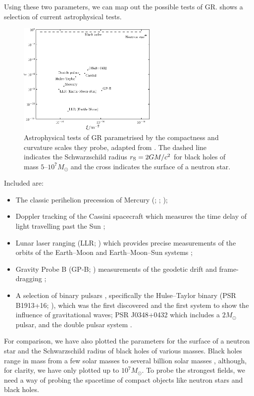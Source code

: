 Using these two parameters, we can map out the possible tests of GR.  shows a selection of current astrophysical tests.
\begin{figure}
  \begin{center}
  \includegraphics[width=0.6\textwidth]{./images/Fig_Psaltis_plot}
    \caption{Astrophysical tests of GR parametrised by the compactness and curvature scales they probe, adapted from \citet{Psaltis2008a}. The dashed line indicates the Schwarzschild radius $r_\mathrm{S} = 2 GM /c^2$ for black holes of mass $5$--$10^7M_\odot$ and the cross indicates the surface of a neutron star.}   
    \label{fig:Psaltis} 
  \end{center}
\end{figure}
Included are:
\begin{itemize}
\item The classic perihelion precession of Mercury (\citealt[section 10.2]{Hobson2006}; \citealt[section 7.3]{Will1993}; \citealt{Pitjeva2009a});
\item Doppler tracking of the Cassini spacecraft \citep{Bertotti2003} which measures the time delay of light travelling past the Sun \citep[section 7.2]{Will1993};
\item Lunar laser ranging (LLR; \citealt{Bender1973,Williams2012}) which provides precise measurements of the orbits of the Earth--Moon and Earth--Moon--Sun systems \citep[section 8.1]{Will1993};
\item Gravity Probe B (GP-B; \citealt{Everitt2009,Everitt2011}) measurements of the geodetic drift and frame-dragging \citep[section 9.1]{Will1993};
\item A selection of binary pulsars \citep{Taylor1993,Stairs2003}, specifically the Hulse--Taylor binary (PSR B1913+16; \citealt{Hulse1975,Weisberg2010}), which was the first discovered and the first system to show the influence of gravitational waves; PSR J0348+0432 \citep{Antoniadis2013} which includes a $2 M_\odot$ pulsar, and the double pulsar system \citep{Breton2008,Kramer2008}. %
\end{itemize}
For comparison, we have also plotted the parameters for the surface of a neutron star and the Schwarzschild radius of black holes of various masses. Black holes range in mass from a few solar masses \citep{Ozel2010} to several billion solar masses \citep{Hlavacek-Larrondo2012}, although, for clarity, we have only plotted up to $10^7 M_\odot$. To probe the strongest fields, we need a way of probing the spacetime of compact objects like neutron stars and black holes.

